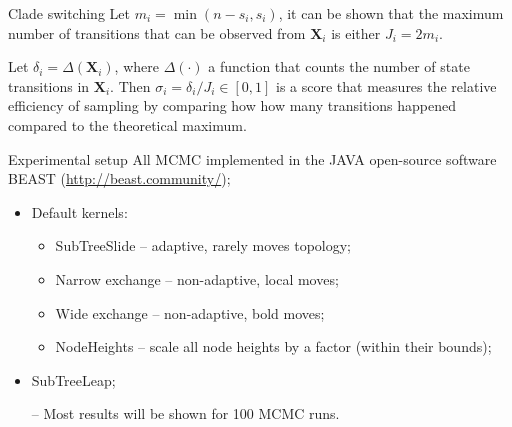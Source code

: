 \documentclass[newPxFont,numfooter,sectionpages]{beamer}
\begin{document}
\begin{frame}{Clade switching}
Let $m_i = \min(n - s_i, s_i)$, it can be shown that the maximum number of transitions that can be observed from $\boldsymbol X_i$ is either $J_i = 2 m_i$.

Let $\delta_i = \Delta(\boldsymbol X_i)$, where $\Delta(\cdot)$ a function that counts the number of state transitions in $\boldsymbol X_i$.
Then $\sigma_i = \delta_i/J_i \in [0, 1]$ is a score that measures the relative efficiency of sampling by comparing how how many transitions happened compared to the theoretical maximum. 
\end{frame}

\begin{frame}{Experimental setup}
 All MCMC implemented in the JAVA open-source software BEAST (\url{http://beast.community/});
 \begin{itemize}
  \item  Default kernels:
  \begin{itemize}
  \item SubTreeSlide -- adaptive, rarely moves topology;
  \item Narrow exchange -- non-adaptive, local moves;
  \item Wide exchange -- non-adaptive, bold moves;
  \item NodeHeights -- scale all node heights by a factor (within their bounds);
 \end{itemize}
  \item SubTreeLeap;
 \end{itemize}

\begin{itemize}
 \item[--] Most results will be shown for 100 MCMC runs.
\end{itemize}


\end{frame}
\end{document}

